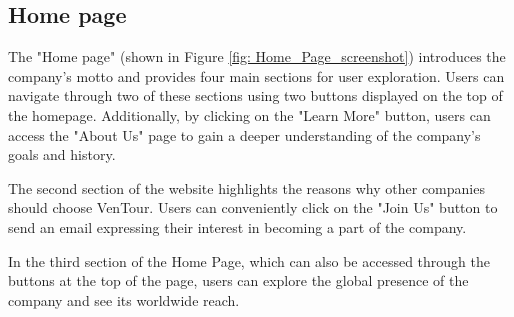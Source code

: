 \documentclass[../../DD.tex]{subfiles}
\begin{document}
\subsection{Home page}
    The "Home page" (shown in Figure \ref{fig: Home_Page_screenshot}) introduces the company's motto and provides four main sections for user exploration. Users can navigate through two of these sections using two buttons displayed on the top of the homepage. Additionally, by clicking on the "Learn More" button, users can access the "About Us" page to gain a deeper understanding of the company's goals and history.

    The second section of the website highlights the reasons why other companies should choose VenTour. Users can conveniently click on the "Join Us" button to send an email expressing their interest in becoming a part of the company.

    In the third section of the Home Page, which can also be accessed through the buttons at the top of the page, users can explore the global presence of the company and see its worldwide reach.

    
\end{document}
